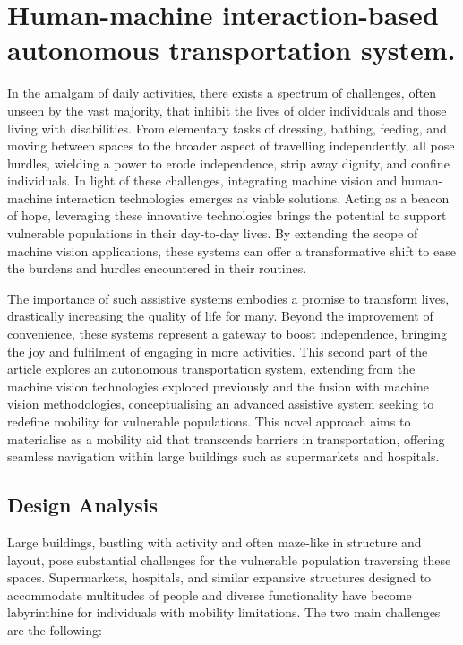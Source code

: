 \documentclass[9pt,conference]{IEEEtran}
\begin{document}
\section{Human-machine interaction-based autonomous transportation system.}

In the amalgam of daily activities, there exists a spectrum of challenges, often unseen by the vast majority, that inhibit the lives of older individuals and those living with disabilities. From elementary tasks of dressing, bathing, feeding, and moving between spaces to the broader aspect of travelling independently, all pose hurdles, wielding a power to erode independence, strip away dignity, and confine individuals. In light of these challenges, integrating machine vision and human-machine interaction technologies emerges as viable solutions. Acting as a beacon of hope, leveraging these innovative technologies brings the potential to support vulnerable populations in their day-to-day lives. By extending the scope of machine vision applications, these systems can offer a transformative shift to ease the burdens and hurdles encountered in their routines.

The importance of such assistive systems embodies a promise to transform lives, drastically increasing the quality of life for many. Beyond the improvement of convenience, these systems represent a gateway to boost independence, bringing the joy and fulfilment of engaging in more activities. This second part of the article explores an autonomous transportation system, extending from the machine vision technologies explored previously and the fusion with machine vision methodologies, conceptualising an advanced assistive system seeking to redefine mobility for vulnerable populations. This novel approach aims to materialise as a mobility aid that transcends barriers in transportation, offering seamless navigation within large buildings such as supermarkets and hospitals.

\subsection{Design Analysis}

Large buildings, bustling with activity and often maze-like in structure and layout, pose substantial challenges for the vulnerable population traversing these spaces. Supermarkets, hospitals, and similar expansive structures designed to accommodate multitudes of people and diverse functionality have become labyrinthine for individuals with mobility limitations. The two main challenges are the following:
\end{document}
